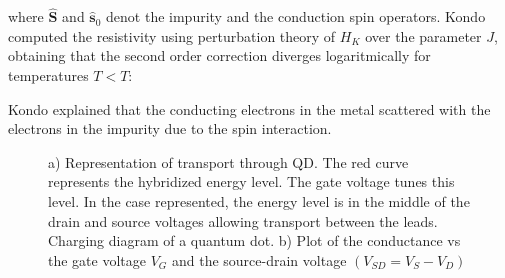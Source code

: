 where $\hat{\textbf{S}}$ and $\hat{\textbf{s}}_0$ denot the impurity and the conduction spin operators. Kondo computed the resistivity using perturbation theory of $H_K$ over the parameter $J$, obtaining that the second order correction diverges logaritmically for temperatures $T<T:$

 Kondo explained that the conducting electrons in the metal scattered with the electrons in the impurity due to the spin interaction.

\citep{hewson_kondo_1997}

\begin{figure}[t]
     \centering
    
     \caption{ a) Representation of transport through QD. The red curve represents the hybridized energy level. The gate voltage tunes this level. In the case represented, the energy level is in the middle of the drain and source voltages allowing transport between the leads.   Charging diagram of a quantum dot. b) Plot of the conductance vs the gate voltage $V_G$ and the source-drain voltage $(V_{SD}=V_{S}-V_{D} )$ \protect{}}
\end{figure}

